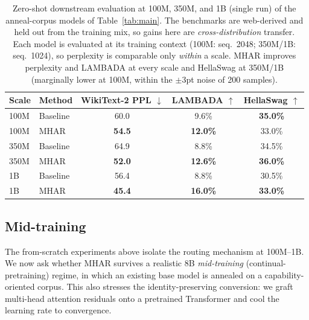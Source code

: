 \documentclass{article}
\begin{document}
\begin{table}[h]
\centering
\caption{Zero-shot downstream evaluation at 100M, 350M, and 1B (single run) of the
anneal-corpus models of Table~\ref{tab:main}. The benchmarks are web-derived and
held out from the training mix, so gains here are \emph{cross-distribution}
transfer. Each model is evaluated at its training context (100M: seq.\ 2048;
350M/1B: seq.\ 1024), so perplexity is comparable only \emph{within} a scale.
MHAR improves perplexity and LAMBADA at every scale and HellaSwag at 350M/1B
(marginally lower at 100M, within the $\pm3$pt noise of 200 samples).}
\label{tab:downstream}
\begin{tabular}{llccc}
\toprule
\textbf{Scale} & \textbf{Method} & \textbf{WikiText-2 PPL $\downarrow$} & \textbf{LAMBADA $\uparrow$} & \textbf{HellaSwag $\uparrow$} \\
\midrule
100M & Baseline  & 60.0 & 9.6\% & \textbf{35.0\%} \\
100M & MHAR  & \textbf{54.5} & \textbf{12.0\%} & 33.0\% \\
\midrule
350M & Baseline  & 64.9 & 8.8\% & 34.5\% \\
350M & MHAR  & \textbf{52.0} & \textbf{12.6\%} & \textbf{36.0\%} \\
\midrule
1B & Baseline  & 56.4 & 8.8\% & 30.5\% \\
1B & MHAR  & \textbf{45.4} & \textbf{16.0\%} & \textbf{33.0\%} \\
\bottomrule
\end{tabular}
\end{table}

\subsection{Mid-training}
\label{sec:midtrain}

The from-scratch experiments above isolate the routing mechanism at
100M--1B. We now ask whether MHAR survives a realistic 8B \emph{mid-training}
(continual-pretraining) regime, in which an existing base model is annealed on a
capability-oriented corpus. This also stresses the identity-preserving conversion:
we graft multi-head attention residuals onto a pretrained Transformer and cool the
learning rate to convergence.
\end{document}
